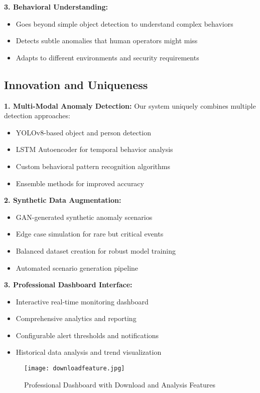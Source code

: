 \documentclass[12pt,a4paper]{article}
\begin{document}
\textbf{3. Behavioral Understanding:}
\begin{itemize}
    \item Goes beyond simple object detection to understand complex behaviors
    \item Detects subtle anomalies that human operators might miss
    \item Adapts to different environments and security requirements
\end{itemize}

\subsection{Innovation and Uniqueness}

\textbf{1. Multi-Modal Anomaly Detection:}
Our system uniquely combines multiple detection approaches:
\begin{itemize}
    \item YOLOv8-based object and person detection
    \item LSTM Autoencoder for temporal behavior analysis
    \item Custom behavioral pattern recognition algorithms
    \item Ensemble methods for improved accuracy
\end{itemize}

\textbf{2. Synthetic Data Augmentation:}
\begin{itemize}
    \item GAN-generated synthetic anomaly scenarios
    \item Edge case simulation for rare but critical events
    \item Balanced dataset creation for robust model training
    \item Automated scenario generation pipeline
\end{itemize}

\textbf{3. Professional Dashboard Interface:}
\begin{itemize}
    \item Interactive real-time monitoring dashboard
    \item Comprehensive analytics and reporting
    \item Configurable alert thresholds and notifications
    \item Historical data analysis and trend visualization
\end{itemize}

\begin{figure}[H]
    \centering
    \texttt{[image: downloadfeature.jpg]}
    \caption{Professional Dashboard with Download and Analysis Features}
    \label{fig:dashboard}
\end{figure}
\end{document}
